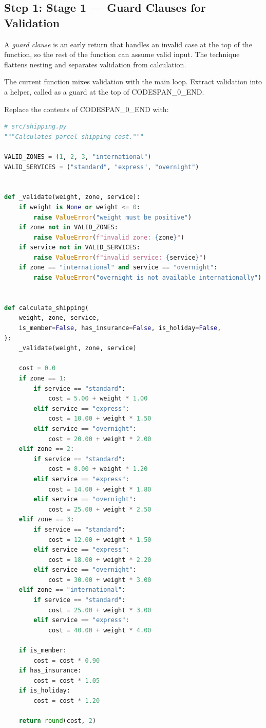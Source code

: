 \documentclass[11pt,a4paper]{book}
\begin{document}
\medskip

\subsection{Step 1: Stage 1 --- Guard Clauses for Validation}

A \textit{guard clause} is an early return that handles an invalid case at the top of the function, so the rest of the function can assume valid input. The technique flattens nesting and separates validation from calculation.

The current function mixes validation with the main loop. Extract validation into a helper, called as a guard at the top of CODESPAN\_0\_END.

Replace the contents of CODESPAN\_0\_END with:

\begin{lstlisting}[language=Python]
# src/shipping.py
"""Calculates parcel shipping cost."""

VALID_ZONES = (1, 2, 3, "international")
VALID_SERVICES = ("standard", "express", "overnight")


def _validate(weight, zone, service):
    if weight is None or weight <= 0:
        raise ValueError("weight must be positive")
    if zone not in VALID_ZONES:
        raise ValueError(f"invalid zone: {zone}")
    if service not in VALID_SERVICES:
        raise ValueError(f"invalid service: {service}")
    if zone == "international" and service == "overnight":
        raise ValueError("overnight is not available internationally")


def calculate_shipping(
    weight, zone, service,
    is_member=False, has_insurance=False, is_holiday=False,
):
    _validate(weight, zone, service)

    cost = 0.0
    if zone == 1:
        if service == "standard":
            cost = 5.00 + weight * 1.00
        elif service == "express":
            cost = 10.00 + weight * 1.50
        elif service == "overnight":
            cost = 20.00 + weight * 2.00
    elif zone == 2:
        if service == "standard":
            cost = 8.00 + weight * 1.20
        elif service == "express":
            cost = 14.00 + weight * 1.80
        elif service == "overnight":
            cost = 25.00 + weight * 2.50
    elif zone == 3:
        if service == "standard":
            cost = 12.00 + weight * 1.50
        elif service == "express":
            cost = 18.00 + weight * 2.20
        elif service == "overnight":
            cost = 30.00 + weight * 3.00
    elif zone == "international":
        if service == "standard":
            cost = 25.00 + weight * 3.00
        elif service == "express":
            cost = 40.00 + weight * 4.00

    if is_member:
        cost = cost * 0.90
    if has_insurance:
        cost = cost * 1.05
    if is_holiday:
        cost = cost * 1.20

    return round(cost, 2)
\end{lstlisting}
\end{document}

